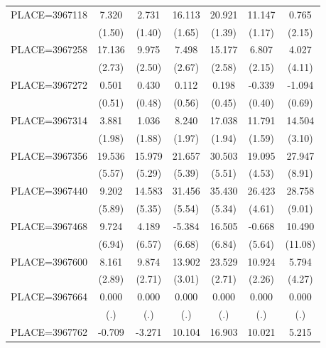 {\begin{tabular}{l*{6}{c}}
PLACE=3967118       &       7.320&       2.731&      16.113&      20.921&      11.147&       0.765\\
                    &      (1.50)&      (1.40)&      (1.65)&      (1.39)&      (1.17)&      (2.15)\\
PLACE=3967258       &      17.136&       9.975&       7.498&      15.177&       6.807&       4.027\\
                    &      (2.73)&      (2.50)&      (2.67)&      (2.58)&      (2.15)&      (4.11)\\
PLACE=3967272       &       0.501&       0.430&       0.112&       0.198&      -0.339&      -1.094\\
                    &      (0.51)&      (0.48)&      (0.56)&      (0.45)&      (0.40)&      (0.69)\\
PLACE=3967314       &       3.881&       1.036&       8.240&      17.038&      11.791&      14.504\\
                    &      (1.98)&      (1.88)&      (1.97)&      (1.94)&      (1.59)&      (3.10)\\
PLACE=3967356       &      19.536&      15.979&      21.657&      30.503&      19.095&      27.947\\
                    &      (5.57)&      (5.29)&      (5.39)&      (5.51)&      (4.53)&      (8.91)\\
PLACE=3967440       &       9.202&      14.583&      31.456&      35.430&      26.423&      28.758\\
                    &      (5.89)&      (5.35)&      (5.54)&      (5.34)&      (4.61)&      (9.01)\\
PLACE=3967468       &       9.724&       4.189&      -5.384&      16.505&      -0.668&      10.490\\
                    &      (6.94)&      (6.57)&      (6.68)&      (6.84)&      (5.64)&     (11.08)\\
PLACE=3967600       &       8.161&       9.874&      13.902&      23.529&      10.924&       5.794\\
                    &      (2.89)&      (2.71)&      (3.01)&      (2.71)&      (2.26)&      (4.27)\\
PLACE=3967664       &       0.000&       0.000&       0.000&       0.000&       0.000&       0.000\\
                    &         (.)&         (.)&         (.)&         (.)&         (.)&         (.)\\
PLACE=3967762       &      -0.709&      -3.271&      10.104&      16.903&      10.021&       5.215\\

\end{tabular}}
